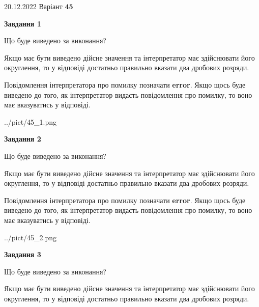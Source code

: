 \documentclass[12pt, ukrainian]{article}
\begin{document}
{20.12.2022 Варіант \No \textbf { 45 }\par}
{
\begin {Large}

{\begin {center}\textbf{Завдання 1}\end {center}}\par
Що буде виведено за виконання? \par

Якщо має бути виведено дійсне значення та інтерпретатор має здійснювати його округлення, 
то у відповіді достатньо правильно вказати два дробових розряди.

Повідомлення інтерпретатора про помилку позначати \textbf{error}.
Якщо щось буде виведено до того, як інтерпретатор видасть повідомлення про помилку, 
то воно має вказуватись у відповіді. \par

\begin{center}
	{../pict/45_1.png}
\end{center}
\newpage

{\begin {center}\textbf{Завдання 2}\end {center}}\par
Що буде виведено за виконання? \par

Якщо має бути виведено дійсне значення та інтерпретатор має здійснювати його округлення, 
то у відповіді достатньо правильно вказати два дробових розряди.

Повідомлення інтерпретатора про помилку позначати \textbf{error}.
Якщо щось буде виведено до того, як інтерпретатор видасть повідомлення про помилку, 
то воно має вказуватись у відповіді. \par

\begin{center}
	{../pict/45_2.png}
\end{center}
\newpage

{\begin {center}\textbf{Завдання 3}\end {center}}\par
Що буде виведено за виконання? \par

Якщо має бути виведено дійсне значення та інтерпретатор має здійснювати його округлення, 
то у відповіді достатньо правильно вказати два дробових розряди.


\end{Large}}
\end{document}
